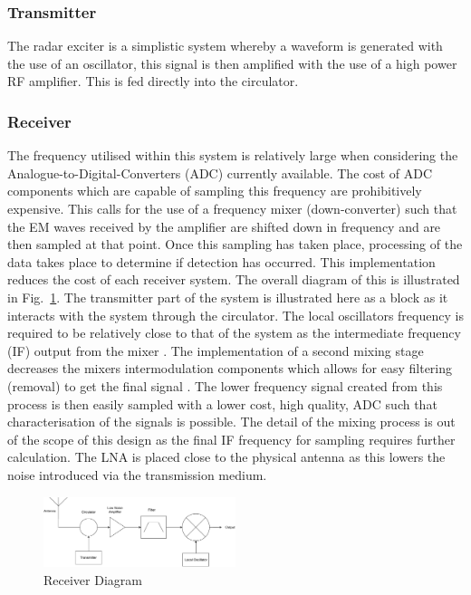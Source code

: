 \documentclass[11pt]{witseiepaper}
\begin{document}
\begin{bibunit}[witseie]
\subsubsection{Transmitter} \label{sec:Transmitter}
The radar exciter is a simplistic system whereby a waveform is generated with the use of an oscillator, this signal is then amplified with the use of a high power RF amplifier. This is fed directly into the circulator.

\subsubsection{Receiver} \label{sec:Receiver}
The frequency utilised within this system is relatively large when considering the Analogue-to-Digital-Converters (ADC) currently available. The cost of ADC components which are capable of sampling this frequency are prohibitively expensive.
This calls for the use of a frequency mixer (down-converter) such that the EM waves received by the amplifier are shifted down in frequency and are then sampled at that point. Once this sampling has taken place, processing of the data takes place to determine if detection has occurred.
This implementation reduces the cost of each receiver system. The overall diagram of this is illustrated in Fig.~\ref{fig:ReceiverDiagram}. The transmitter part of the system is illustrated here as a block as it interacts with the system through the circulator. The local oscillators frequency is required to be relatively close to that of the system as the intermediate frequency (IF) output from the mixer \cite[p.~397-398]{radarHandbook}.
The implementation of a second mixing stage decreases the mixers intermodulation components which allows for easy filtering (removal) to get the final signal \cite[p.~398]{radarHandbook}.
The lower frequency signal created from this process is then easily sampled with a lower cost, high quality, ADC such that characterisation of the signals is possible. The detail of the mixing process is out of the scope of this design as the final IF frequency for sampling requires further calculation.
The LNA is placed close to the physical antenna as this lowers the noise introduced via the transmission medium.%
\begin{center}
    \begin{figure}
        \centering
        \includegraphics[width=0.5\textwidth]{ReceiverDiagram.pdf}
        \caption{Receiver Diagram}
        \label{fig:ReceiverDiagram}    
    \end{figure}
\end{center}


\end{bibunit}
\end{document}
